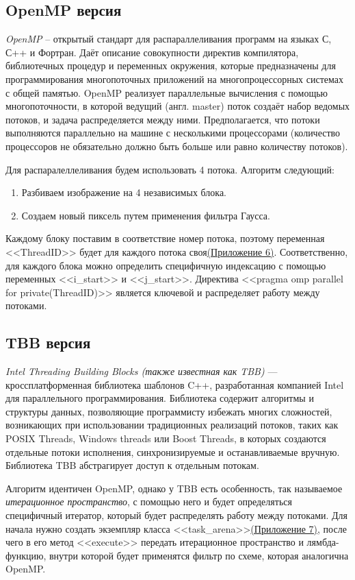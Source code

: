 \documentclass[12pt]{article}
\begin{document}
\subsection{OpenMP версия}
\textit{OpenMP}\cite{omp} -- открытый стандарт для распараллеливания программ на языках С, С++ и Фортран. Даёт описание совокупности директив компилятора, библиотечных процедур и переменных окружения, которые предназначены для программирования многопоточных приложений на многопроцессорных системах с общей памятью. OpenMP реализует параллельные вычисления с помощью многопоточности, в которой ведущий (англ. master) поток создаёт набор ведомых потоков, и задача распределяется между ними. Предполагается, что потоки выполняются параллельно на машине с несколькими процессорами (количество процессоров не обязательно должно быть больше или равно количеству потоков).
\par
Для распаралеллеливания будем использовать 4 потока. Алгоритм следующий:
\begin{enumerate}
	\item Разбиваем изображение на 4 независимых блока.
	\item Создаем новый пиксель путем применения фильтра Гаусса. 
\end{enumerate}
\par
Каждому блоку поставим в соответствие номер потока, поэтому переменная <<ThreadID>> будет для каждого потока своя\hyperref[lst:omp]{(Приложение 6)}. Соответственно, для каждого блока можно определить специфичную индексацию с помощью переменных <<i\_start>> и <<j\_start>>. Директива <<pragma omp parallel for private(ThreadID)>> является ключевой и распределяет работу между потоками.

\subsection{TBB версия}
\textit{Intel Threading Building Blocks (также известная как TBB)}\cite{tbb} — кроссплатформенная библиотека шаблонов C++, разработанная компанией Intel для параллельного программирования. Библиотека содержит алгоритмы и структуры данных, позволяющие программисту избежать многих сложностей, возникающих при использовании традиционных реализаций потоков, таких как POSIX Threads, Windows threads или Boost Threads, в которых создаются отдельные потоки исполнения, синхронизируемые и останавливаемые вручную. Библиотека TBB абстрагирует доступ к отдельным потокам.
\par
Алгоритм идентичен OpenMP, однако у TBB есть особенность, так называемое \textit{итерационное пространство}, с помощью него и будет определяться специфичный итератор, который будет распределять работу между потоками. Для начала нужно создать экземпляр класса <<task\_arena>>\hyperref[lst:tbb]{(Приложение 7)}, после чего в его метод <<execute>> передать итерационное пространство и лямбда-функцию, внутри которой будет применятся фильтр по схеме, которая аналогична OpenMP.
\end{document}
